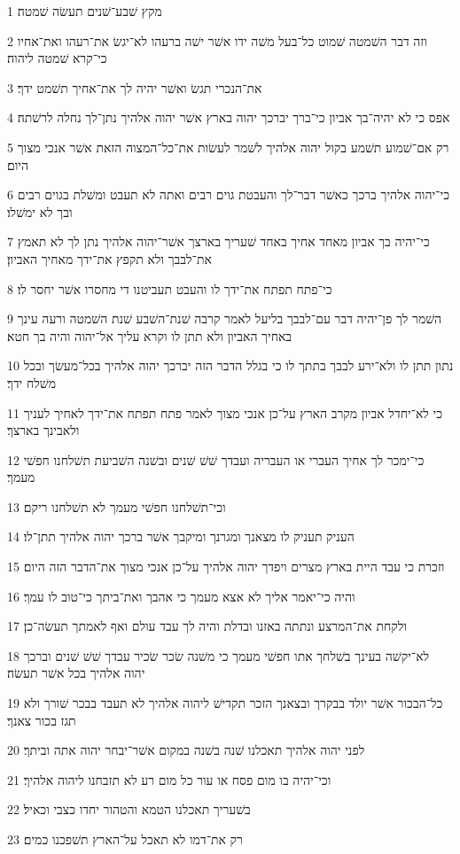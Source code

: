 \par 1 מקץ שׁבע־שׁנים תעשׂה שׁמטה׃
\par 2 וזה דבר השׁמטה שׁמוט כל־בעל משׁה ידו אשׁר ישׁה ברעהו לא־יגשׂ את־רעהו ואת־אחיו כי־קרא שׁמטה ליהוה׃
\par 3 את־הנכרי תגשׂ ואשׁר יהיה לך את־אחיך תשׁמט ידך׃
\par 4 אפס כי לא יהיה־בך אביון כי־ברך יברכך יהוה בארץ אשׁר יהוה אלהיך נתן־לך נחלה לרשׁתה׃
\par 5 רק אם־שׁמוע תשׁמע בקול יהוה אלהיך לשׁמר לעשׂות את־כל־המצוה הזאת אשׁר אנכי מצוך היום׃
\par 6 כי־יהוה אלהיך ברכך כאשׁר דבר־לך והעבטת גוים רבים ואתה לא תעבט ומשׁלת בגוים רבים ובך לא ימשׁלו׃
\par 7 כי־יהיה בך אביון מאחד אחיך באחד שׁעריך בארצך אשׁר־יהוה אלהיך נתן לך לא תאמץ את־לבבך ולא תקפץ את־ידך מאחיך האביון׃
\par 8 כי־פתח תפתח את־ידך לו והעבט תעביטנו די מחסרו אשׁר יחסר לו׃
\par 9 השׁמר לך פן־יהיה דבר עם־לבבך בליעל לאמר קרבה שׁנת־השׁבע שׁנת השׁמטה ורעה עינך באחיך האביון ולא תתן לו וקרא עליך אל־יהוה והיה בך חטא׃
\par 10 נתון תתן לו ולא־ירע לבבך בתתך לו כי בגלל הדבר הזה יברכך יהוה אלהיך בכל־מעשׂך ובכל משׁלח ידך׃
\par 11 כי לא־יחדל אביון מקרב הארץ על־כן אנכי מצוך לאמר פתח תפתח את־ידך לאחיך לעניך ולאבינך בארצך׃
\par 12 כי־ימכר לך אחיך העברי או העבריה ועבדך שׁשׁ שׁנים ובשׁנה השׁביעת תשׁלחנו חפשׁי מעמך׃
\par 13 וכי־תשׁלחנו חפשׁי מעמך לא תשׁלחנו ריקם׃
\par 14 העניק תעניק לו מצאנך ומגרנך ומיקבך אשׁר ברכך יהוה אלהיך תתן־לו׃
\par 15 וזכרת כי עבד היית בארץ מצרים ויפדך יהוה אלהיך על־כן אנכי מצוך את־הדבר הזה היום׃
\par 16 והיה כי־יאמר אליך לא אצא מעמך כי אהבך ואת־ביתך כי־טוב לו עמך׃
\par 17 ולקחת את־המרצע ונתתה באזנו ובדלת והיה לך עבד עולם ואף לאמתך תעשׂה־כן׃
\par 18 לא־יקשׁה בעינך בשׁלחך אתו חפשׁי מעמך כי משׁנה שׂכר שׂכיר עבדך שׁשׁ שׁנים וברכך יהוה אלהיך בכל אשׁר תעשׂה׃
\par 19 כל־הבכור אשׁר יולד בבקרך ובצאנך הזכר תקדישׁ ליהוה אלהיך לא תעבד בבכר שׁורך ולא תגז בכור צאנך׃
\par 20 לפני יהוה אלהיך תאכלנו שׁנה בשׁנה במקום אשׁר־יבחר יהוה אתה וביתך׃
\par 21 וכי־יהיה בו מום פסח או עור כל מום רע לא תזבחנו ליהוה אלהיך׃
\par 22 בשׁעריך תאכלנו הטמא והטהור יחדו כצבי וכאיל׃
\par 23 רק את־דמו לא תאכל על־הארץ תשׁפכנו כמים׃

